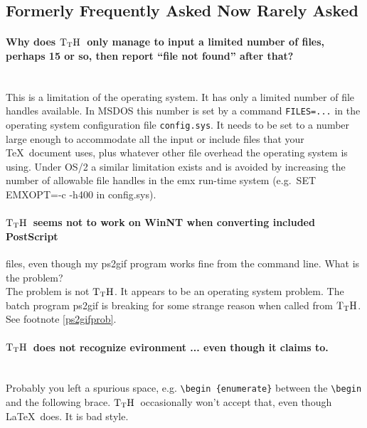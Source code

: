 \documentclass[12pt]{article}
\def\TtH{$\rm{}T_TH$}
\begin{document}
\subsection{Formerly Frequently Asked Now Rarely Asked}

\paragraph{Why does \TtH\ only manage to input a limited number
of files, perhaps 15 or so, then report ``file not found'' after
that?}\leavevmode\\
This is a limitation of the operating system. It has only a limited
number of file handles available. In MSDOS this number is set by a command 
\verb!FILES=...! in the operating system configuration file
\verb|config.sys|. It needs to be set to a number large enough to
accommodate all the input or include files that your \TeX\ document
uses, plus whatever other file overhead the operating system is
using. Under OS/2 a similar limitation exists and is avoided by 
increasing the number of allowable file handles in the emx run-time
system (e.g.~SET EMXOPT=-c -h400 in config.sys). 

\paragraph{\TtH\ seems not to work on WinNT when converting
included PostScript} files, even though my ps2gif program works fine
from the command line. What is the problem?\leavevmode\\
The problem is not \TtH. It appears to be an operating system
problem. The batch program ps2gif is breaking for some strange reason
when called from \TtH. See footnote \ref{ps2gifprob}.

\paragraph{\TtH\ does not recognize evironment ... even though it
claims to.}\leavevmode\\
Probably you left a spurious space, e.g. \verb+\begin {enumerate}+
between the \verb+\begin+ and the following brace. \TtH\ occasionally won't
accept that, even though \LaTeX\ does. It is bad style.

\printindex
\end{document}
